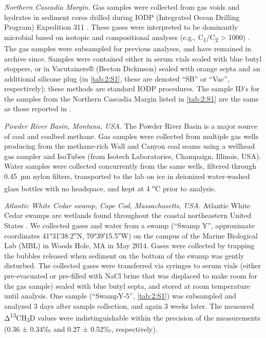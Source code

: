 \emph{Northern Cascadia Margin.} Gas samples were collected from gas
voids and hydrates in sediment cores drilled during IODP (Integrated
Ocean Drilling Program) Expedition 311 \parencite{IODP_x311_Proceedings}. These gases were
interpreted to be dominantly microbial based on isotopic and
compositional analyses (e.g., C\textsubscript{1}/C\textsubscript{2}
\textgreater{} 1000) \parencite{Pohlman++_2009_EPSL}. The gas samples were subsampled for
previous analyses, and have remained in archive since. Samples were
contained either in serum vials sealed with blue butyl stoppers, or in
Vacutainers® (Becton Dickinson) sealed with orange septa and an
additional silicone plug (in \autoref{tab:2:S1}, these are denoted ``SB'' or
``Vac'', respectively); these methods are standard IODP procedures. The
sample ID's for the samples from the Northern Cascadia Margin listed in
\autoref{tab:2:S1} are the same as those reported in \textcite{Pohlman++_2009_EPSL}.

\emph{Powder River Basin, Montana, USA.} The Powder River Basin is a
major source of coal and coalbed methane. Gas samples were collected
from multiple gas wells producing from the methane-rich Wall and Canyon
coal seams using a wellhead gas sampler and IsoTubes (from Isotech
Laboratories, Champaign, Illinois, USA). Water samples were collected
concurrently from the same wells, filtered through 0.45~µm nylon
filters, transported to the lab on ice in deionized water-washed glass
bottles with no headspace, and kept at 4 \textsuperscript{o}C prior to
analysis.

\emph{Atlantic White Cedar swamp, Cape Cod, Massachusetts, USA.}
Atlantic White Cedar swamps are wetlands found throughout the coastal
northeastern United States \parencite{Laderman++_1989}. We collected gases and water
from a swamp (``Swamp Y'', approximate coordinates \ang[minimum-integer-digits=2]{41;31;38.2}N,
\ang[minimum-integer-digits=2]{70;39;15.5}W) on the campus of the Marine Biological Lab (MBL) in Woods
Hole, MA in May 2014. Gases were collected by trapping the bubbles
released when sediment on the bottom of the swamp was gently disturbed.
The collected gases were transferred via syringes to serum vials (either
pre-evacuated or pre-filled with NaCl brine that was displaced to make
room for the gas sample) sealed with blue butyl septa, and stored at
room temperature until analysis. One sample (``SwampY-5'', \autoref{tab:2:S1}) was
subsampled and analyzed 3 days after sample collection, and again 3
weeks later. The measured Δ\textsuperscript{13}CH\textsubscript{3}D
values were indistinguishable within the precision of the measurements
(0.36 ± 0.34‰ and 0.27 ± 0.52‰, respectively).

